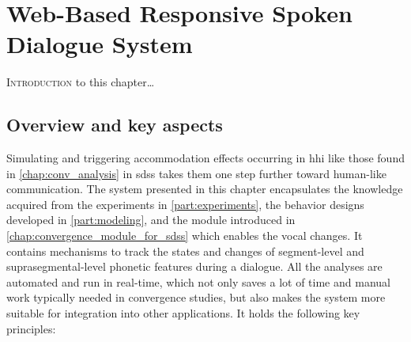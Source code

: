\chapter{Web-Based Responsive Spoken Dialogue System}
\label{chap:web-based_responsive_spoken_dialogue_system}

\lettrine{I}{ntroduction} to this chapter\ldots

\pagebreak

\section{Overview and key aspects}
\label{sec:overview_and_key_aspects}

Simulating and triggering accommodation effects occurring in \ac{hhi} like those found in \cref{chap:conv_analysis} in \acp{sds} takes them one step further toward human-like communication.
The system presented in this chapter encapsulates the knowledge acquired from the experiments in \cref{part:experiments}, the behavior designs developed in \cref{part:modeling}, and the module introduced in \cref{chap:convergence_module_for_sdss} which enables the vocal changes.
It contains mechanisms to track the states and changes of segment-level and suprasegmental-level phonetic features during a dialogue.
All the analyses are automated and run in real-time, which not only saves a lot of time and manual work typically needed in convergence studies, but also makes the system more suitable for integration into other applications.
It holds the following key principles:
%
